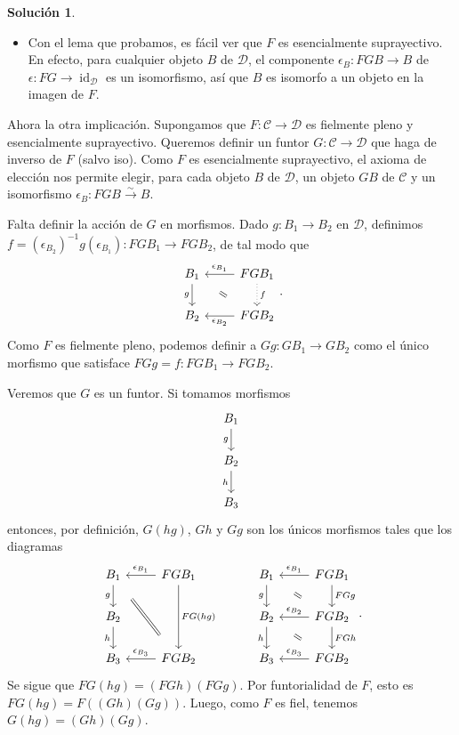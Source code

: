 \documentclass[12pt,letterpaper,titlepage]{article}
\theoremstyle{definition}
\newtheorem*{sol}{Solución}
\renewcommand\cal[1]{\mathcal{#1}}
\newcommand\com[2]{\ar[equal,from={#1},to={#2},shorten=5mm]}
\newcommand\<{\langle}
\renewcommand\>{\rangle}
\DeclareMathOperator{\id}{id}
\begin{document}
\begin{sol}
\begin{itemize}
        \item
        Con el lema que probamos, es fácil ver que $F$ es
        esencialmente suprayectivo.
        En efecto, 
        para cualquier objeto $B$ de $\cal D$, el componente
        $\epsilon_B:FGB\to B$ de $\epsilon:FG\to\id_{\cal D}$ es un
        isomorfismo, así que $B$ es isomorfo a un objeto en la
        imagen de $F$.
    \end{itemize}
    Ahora la otra implicación.
    Supongamos que $F:\cal C\to\cal D$ es fielmente pleno
    y esencialmente suprayectivo.
    Queremos definir un funtor $G:\cal C\to \cal D$ que haga de
    inverso de $F$ (salvo iso).
    Como $F$ es esencialmente suprayectivo, el axioma de
    elección nos permite elegir, para cada objeto $B$ de $\cal D$,
    un objeto $GB$ de $\cal C$ y un isomorfismo
    $\epsilon_B:FGB\xrightarrow{\sim} B$.
    
    Falta definir la acción de $G$ en morfismos.
    Dado $g:B_1\to B_2$ en $\cal D$, definimos
    $f=(\epsilon_{B_2})^{-1}g(\epsilon_{B_1}):FGB_1\to FGB_2$, de tal
    modo que
    \[
        \begin{tikzcd}
            B_1 \ar[d,"g"']
            & FGB_1 \ar[l,"\epsilon_{B_1}"'] \ar[d,"f",dotted] \\
            B_2 & FGB_2 \ar[l,"\epsilon_{B_2}"]
            \com{1-1}{2-2}
        \end{tikzcd}
    .\]
    Como $F$ es fielmente pleno, podemos definir a $Gg:GB_1\to GB_2$
    como el único morfismo que satisface $FGg=f:FGB_1\to FGB_2$.
    
    Veremos que $G$ es un funtor.
    Si tomamos morfismos
    \[
        \begin{tikzcd}
            B_1 \ar[d,"g"'] \\
            B_2 \ar[d,"h"'] \\
            B_3
        \end{tikzcd}
    \]
    entonces, por definición, $G(hg)$, $Gh$ y $Gg$
    son los únicos morfismos tales que los diagramas
    \[
        \begin{tikzcd}
            B_1 \ar[d,"g"'] & FGB_1 \ar[l,"\epsilon_{B_1}"'] \ar[dd,"FG(hg)"] \\
            B_2 \ar[d,"h"'] \\
            B_3 & FGB_2 \ar[l,"\epsilon_{B_3}"']
            \com{1-1}{3-2}
        \end{tikzcd}
        \hspace{10mm}
        \begin{tikzcd}
            B_1 \ar[d,"g"'] & FGB_1 \ar[l,"\epsilon_{B_1}"'] \ar[d,"FGg"] \\
            B_2 \ar[d,"h"'] & FGB_2 \ar[l,"\epsilon_{B_2}"'] \ar[d,"FGh"] \\
            B_3 & FGB_2 \ar[l,"\epsilon_{B_3}"']
            \com{1-1}{2-2} \com{2-1}{3-2}
        \end{tikzcd}
    .\]
    Se sigue que $FG(hg)=(FGh)(FGg)$.
    Por funtorialidad de $F$, esto es $FG(hg)=F((Gh)(Gg))$.
    Luego, como $F$ es fiel, tenemos $G(hg)=(Gh)(Gg)$.
    

\end{sol}
\end{document}
